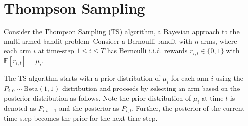 \documentclass[a3paper,12pt]{extarticle} %
\begin{document}
\newpage 

\section{Thompson Sampling}
Consider the Thompson Sampling (TS) algorithm, a Bayesian approach to the multi-armed bandit problem. Consider a Bernoulli bandit with $n$ arms, where each arm $i$ at time-step $1 \leq t \leq T$ has Bernoulli i.i.d. rewards $r_{i,t} \in \{0, 1\}$ with $\mathbb{E}[r_{i,t}] = \mu_i$. 

The TS algorithm starts with a prior distribution of $\mu_i$ for each arm $i$ using the $P_{i,0} \sim \text{Beta}(1, 1)$ distribution and proceeds by selecting an arm based on the posterior distribution as follows. Note the prior distribution of $\mu_i$ at time $t$ is denoted as $P_{i,t-1}$ and the posterior as $P_{i,t}$. Further, the posterior of the current time-step becomes the prior for the next time-step.
\end{document}
